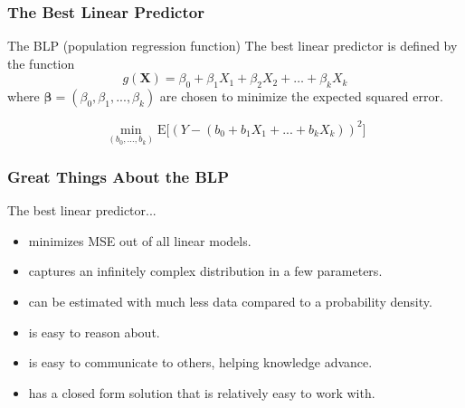 \documentclass[12pt, block=fill]{beamer}
\newcommand{\E}{\text{E}}
\begin{document}
\begin{frame}[t]
  \frametitle{The Best Linear Predictor}

  \begin{block}{The BLP (population regression function)}
    The best linear predictor is defined by the function 
    \[g(\mathbf{X}) = \beta_{0} + \beta_{1}X_{1} + \beta_{2} X_{2} +
      \dots + \beta_{k}X_{k}\] 
    where $\boldsymbol{\beta} = (\beta_0, \beta_1,...,\beta_k)$ are
    chosen to minimize the expected squared error.
    
    \[
      \min_{(b_{0}, \dots, b_{k})}
      \E\big[ (Y - (b_0  + b_1 X_1 + ... +b_k X_k))^2\big]
    \] 
  \end{block}
\end{frame}



\begin{frame}
  \frametitle{Great Things About the BLP}
  The best linear predictor...
  \begin{itemize}
\item minimizes MSE out of all linear models.
\item captures an infinitely complex distribution in a few parameters.
\item can be estimated with much less data compared to a probability density.
\item is easy to reason about.
\item is easy to communicate to others, helping knowledge advance.
\item has a closed form solution that is relatively easy to work with.

\end{itemize}

\end{frame}
\end{document}
